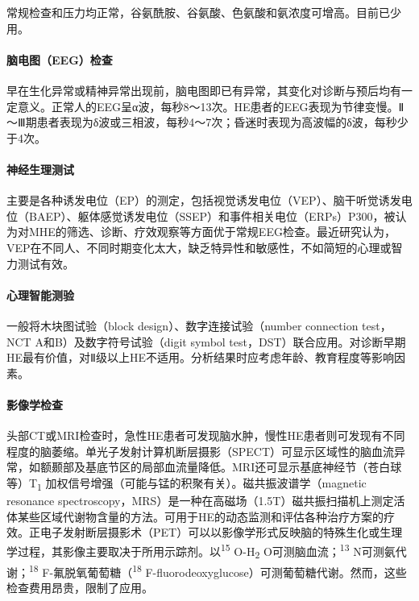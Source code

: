 常规检查和压力均正常，谷氨酰胺、谷氨酸、色氨酸和氨浓度可增高。目前已少用。

\paragraph{脑电图（EEG）检查}

早在生化异常或精神异常出现前，脑电图即已有异常，其变化对诊断与预后均有一定意义。正常人的EEG呈α波，每秒8～13次。HE患者的EEG表现为节律变慢。Ⅱ～Ⅲ期患者表现为δ波或三相波，每秒4～7次；昏迷时表现为高波幅的δ波，每秒少于4次。

\paragraph{神经生理测试}

主要是各种诱发电位（EP）的测定，包括视觉诱发电位（VEP）、脑干听觉诱发电位（BAEP）、躯体感觉诱发电位（SSEP）和事件相关电位（ERPs）P300，被认为对MHE的筛选、诊断、疗效观察等方面优于常规EEG检查。最近研究认为，VEP在不同人、不同时期变化太大，缺乏特异性和敏感性，不如简短的心理或智力测试有效。

\paragraph{心理智能测验}

一般将木块图试验（block design）、数字连接试验（number connection
test，NCT A和B）及数字符号试验（digit symbol
test，DST）联合应用。对诊断早期HE最有价值，对Ⅱ级以上HE不适用。分析结果时应考虑年龄、教育程度等影响因素。

\paragraph{影像学检查}

头部CT或MRI检查时，急性HE患者可发现脑水肿，慢性HE患者则可发现有不同程度的脑萎缩。单光子发射计算机断层摄影（SPECT）可显示区域性的脑血流异常，如额颞部及基底节区的局部血流量降低。MRI还可显示基底神经节（苍白球等）T\textsubscript{1}
加权信号增强（可能与锰的积聚有关）。磁共振波谱学（magnetic resonance
spectroscopy，MRS）是一种在高磁场（1.5T）磁共振扫描机上测定活体某些区域代谢物含量的方法。可用于HE的动态监测和评估各种治疗方案的疗效。正电子发射断层摄影术（PET）可以以影像学形式反映脑的特殊生化或生理学过程，其影像主要取决于所用示踪剂。以\textsuperscript{15}
O-H\textsubscript{2} O可测脑血流；\textsuperscript{13}
N可测氨代谢；\textsuperscript{18} F-氟脱氧葡萄糖（\textsuperscript{18}
F-fluorodeoxyglucose）可测葡萄糖代谢。然而，这些检查费用昂贵，限制了应用。


